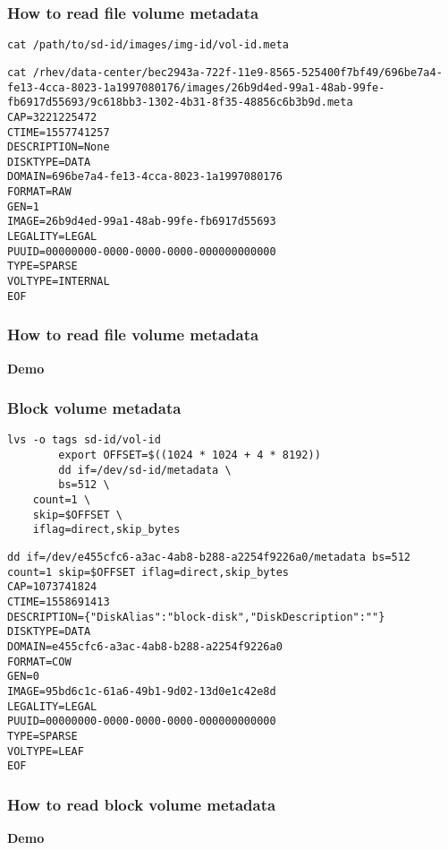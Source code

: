 \documentclass[10pt,utf8]{beamer}
\begin{document}
\begin{frame}[fragile]
	\frametitle{How to read file volume metadata}
	\begin{lstlisting}[style=Bash]
		cat /path/to/sd-id/images/img-id/vol-id.meta
	\end{lstlisting}
\begin{lstlisting}[style=Bash]
cat /rhev/data-center/bec2943a-722f-11e9-8565-525400f7bf49/696be7a4-fe13-4cca-8023-1a1997080176/images/26b9d4ed-99a1-48ab-99fe-fb6917d55693/9c618bb3-1302-4b31-8f35-48856c6b3b9d.meta 
CAP=3221225472
CTIME=1557741257
DESCRIPTION=None
DISKTYPE=DATA
DOMAIN=696be7a4-fe13-4cca-8023-1a1997080176
FORMAT=RAW
GEN=1
IMAGE=26b9d4ed-99a1-48ab-99fe-fb6917d55693
LEGALITY=LEGAL
PUUID=00000000-0000-0000-0000-000000000000
TYPE=SPARSE
VOLTYPE=INTERNAL
EOF
	\end{lstlisting}
\end{frame}

\begin{frame}
  \frametitle{How to read file volume metadata}
	\centering
	\huge{\textbf{Demo}}
\end{frame}

\begin{frame}[fragile]
	\frametitle{Block volume metadata}
	\begin{lstlisting}[style=Bash]
		lvs -o tags sd-id/vol-id
		export OFFSET=$((1024 * 1024 + 4 * 8192))
		dd if=/dev/sd-id/metadata \
		bs=512 \
    count=1 \
    skip=$OFFSET \
    iflag=direct,skip_bytes
	\end{lstlisting}
	\begin{lstlisting}[style=Bash]
dd if=/dev/e455cfc6-a3ac-4ab8-b288-a2254f9226a0/metadata bs=512 count=1 skip=$OFFSET iflag=direct,skip_bytes
CAP=1073741824
CTIME=1558691413
DESCRIPTION={"DiskAlias":"block-disk","DiskDescription":""}
DISKTYPE=DATA
DOMAIN=e455cfc6-a3ac-4ab8-b288-a2254f9226a0
FORMAT=COW
GEN=0
IMAGE=95bd6c1c-61a6-49b1-9d02-13d0e1c42e8d
LEGALITY=LEGAL
PUUID=00000000-0000-0000-0000-000000000000
TYPE=SPARSE
VOLTYPE=LEAF
EOF
	\end{lstlisting}
\end{frame}

\begin{frame}
  \frametitle{How to read block volume metadata}
	\centering
	\huge{\textbf{Demo}}
\end{frame}
\end{document}
